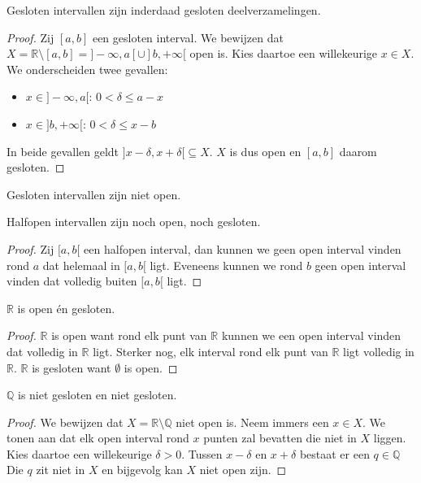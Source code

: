 \documentclass[main.tex]{subfiles}
\begin{document}
\begin{st}
  Gesloten intervallen zijn inderdaad gesloten deelverzamelingen.

  \begin{proof}
    Zij $[a,b]$ een gesloten interval.
    We bewijzen dat $X = \mathbb{R} \setminus [a,b] = ]-\infty,a[ \cup]b,+\infty[$ open is.
    Kies daartoe een willekeurige $x\in X$.
    We onderscheiden twee gevallen:
    \begin{itemize}
    \item $x \in ]-\infty,a[$: $0 < \delta \le a-x$
    \item $x \in  ]b,+\infty[$: $0 < \delta \le x-b$
    \end{itemize}
    In beide gevallen geldt $]x-\delta, x+\delta[ \subseteq X$. $X$ is dus open en $[a,b]$ daarom gesloten.
  \end{proof}
\end{st}

\begin{st}
  Gesloten intervallen zijn niet open.
\end{st}

\begin{st}
  Halfopen intervallen zijn noch open, noch gesloten.

  \begin{proof}
    Zij $[a,b[$ een halfopen interval, dan kunnen we geen open interval vinden rond $a$ dat helemaal in $[a,b[$ ligt.
    Eveneens kunnen we rond $b$ geen open interval vinden dat volledig buiten $[a,b[$ ligt.
  \end{proof}
\end{st}

\begin{st}
  \label{st:r-open-en-gesloten}
  $\mathbb{R}$ is open \'en gesloten.

  \begin{proof}
    $\mathbb{R}$ is open want rond elk punt van $\mathbb{R}$ kunnen we een open interval vinden dat volledig in $\mathbb{R}$ ligt.
    Sterker nog, elk interval rond elk punt van $\mathbb{R}$ ligt volledig in $\mathbb{R}$.
    $\mathbb{R}$ is gesloten want $\emptyset$ is open.
  \end{proof}
\end{st}

\begin{st}
  $\mathbb{Q}$ is niet gesloten en niet gesloten.

  \begin{proof}
    We bewijzen dat $X=\mathbb{R}\setminus \mathbb{Q}$ niet open is.
    Neem immers een $x\in X$.
    We tonen aan dat elk open interval rond $x$ punten zal bevatten die niet in $X$ liggen.
    Kies daartoe een willekeurige $\delta > 0$.
    Tussen $x-\delta$ en $x+\delta$ bestaat er een $q\in \mathbb{Q}$
    Die $q$ zit niet in $X$ en bijgevolg kan $X$ niet open zijn.
  \end{proof}
\end{st}
\end{document}
